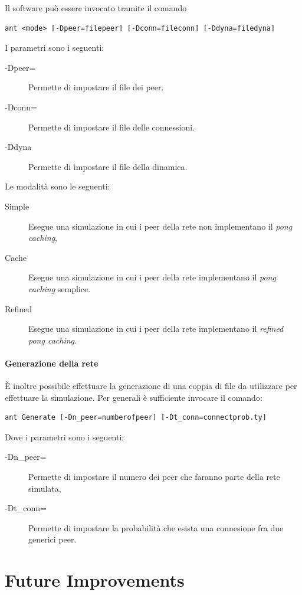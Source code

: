 \documentclass[a4paper,11pt]{article}
\begin{document}
Il software pu\`o essere invocato tramite il comando
\begin{lstlisting}
ant <mode> [-Dpeer=filepeer] [-Dconn=fileconn] [-Ddyna=filedyna]
\end{lstlisting}



I parametri sono i seguenti:
\begin{description}
\item[-Dpeer=] Permette di impostare il file dei peer.
\item[-Dconn=] Permette di impostare il file delle connessioni.
\item[-Ddyna] Permette di impostare il file della dinamica.
\end{description}

Le modalit\`a sono le seguenti:
\begin{description}
\item[Simple] Esegue una simulazione in cui i peer della rete non implementano il \emph{pong caching},
\item[Cache] Esegue una simulazione in cui i peer della rete implementano il \emph{pong caching} semplice.
\item[Refined] Esegue una simulazione in cui i peer della rete implementano il \emph{refined pong caching}.
\end{description}

\paragraph{Generazione della rete}
\`E inoltre possibile effettuare la generazione di una coppia di file da utilizzare per effettuare la simulazione. Per generali \`e sufficiente invocare il comando:
\begin{lstlisting}
ant Generate [-Dn_peer=numberofpeer] [-Dt_conn=connectprob.ty]
\end{lstlisting}

Dove i parametri sono i seguenti:
\begin{description}
\item[-Dn\_peer=] Permette di impostare il numero dei peer che faranno parte della rete simulata,
\item[-Dt\_conn=] Permette di impostare la probabilit\`a che esista una connesione fra due generici peer.
\end{description}

\section{Future Improvements}
\end{document}
